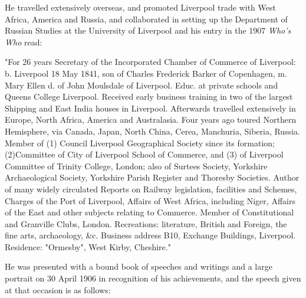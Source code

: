 He travelled extensively overseas, and promoted Liverpool trade with West Africa, America and Russia, and collaborated in setting up the Department of Russian Studies at the University of Liverpool and his entry in  the 1907 \emph{Who's Who} read:

"For 26 years Secretary of the Incorporated Chamber of Commerce of Liverpool: b. Liverpool 18 May 1841, son of Charles Frederick Barker of Copenhagen, m. Mary Ellen d. of John Moulsdale of Liverpool. Educ. at private schools and Queens College Liverpool. Received early business training in two of the largest Shipping and East India houses in Liverpool. Afterwards travelled extensively in Europe, North Africa, America and Australasia. Four years ago toured Northern Hemisphere, via Canada, Japan, North China, Cerea, Manchuria, Siberia, Russia. Member of (1) Council Liverpool Geographical Society since its formation; (2)Committee of City of Liverpool School of Commerce, and (3) of Liverpool Committee of Trinity College, London; also of Surtees Society, Yorkshire Archaeological Society, Yorkshire Parish Register and Thoresby Societies. Author of many widely circulated Reports on Railway legislation, facilities and Schemes, Charges of the Port of Liverpool, Affairs of West Africa, including Niger, Affairs of the East and other subjects relating to Commerce. Member of Constitutional and Granville Clubs, London. Recreations: literature, British and Foreign, the fine arts, archaeology, \&c. Business address B10, Exchange Buildings, Liverpool. Residence: "Ormesby", West Kirby, Cheshire."

He was presented with a bound book of speeches and writings and a large portrait on 30 April 1906 in recognition of his achievements,  and the speech given at that occasion is as follows:\cite{THBbio}


